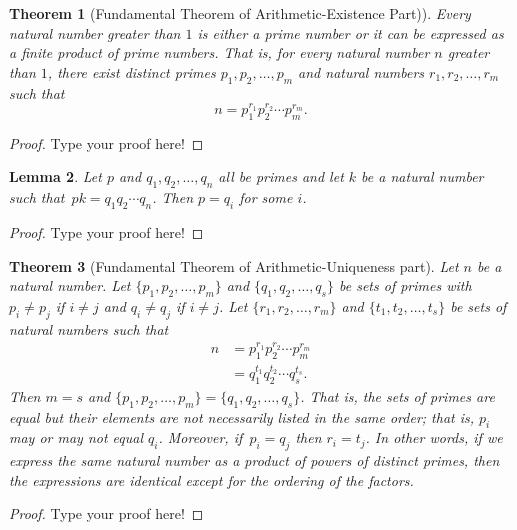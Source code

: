 \documentclass[12pt,leqno]{article}
\numberwithin{equation}{section}
\newtheorem{thm}{Theorem}[section]
\newtheorem{lem}[thm]{Lemma}
\theoremstyle{definition}
\begin{document}
\setcounter{thm}{6}


\begin{thm}[Fundamental Theorem of Arithmetic-Existence Part)]
Every natural number greater than $1$ is either a prime number or it
can be expressed as a finite product of prime numbers. That is, for
every natural number $n$ greater than $1$, there exist distinct
primes $p_1, p_2, \hdots, p_m$ and natural numbers $r_1, r_2,
\hdots, r_m$ such that \[n = p_1^{r_1}p_2^{r_2}\cdots p_m^{r_m}.\]
\end{thm}

\begin{proof}[Proof]
Type your proof here!
\end{proof}



\begin{lem}
Let $p$ and $q_1, q_2, \hdots, q_n$ all be primes and let $k$ be a
natural number such that~$p k = q_1q_2 \cdots q_n$.  Then $p = q_i$
for some $i$.
\end{lem}

\begin{proof}[Proof]
Type your proof here!
\end{proof}



\begin{thm}[Fundamental Theorem of Arithmetic-Uniqueness part]
Let $n$ be a natural number.  Let $\{p_1, p_2, \hdots, p_m\}$ and
$\{q_1, q_2, \hdots, q_s\}$ be sets of primes with $p_i \neq p_j$ if
$i \neq j$ and $q_i \neq q_j$ if $i \neq j$. Let $\{r_1, r_2,
\hdots, r_m\}$ and $\{t_1, t_2, \hdots, t_s\}$ be sets of natural
numbers such that
\begin{align*}
n & = p_1^{r_1}p_2^{r_2}\cdots p_m^{r_m} \\
  & = q_1^{t_1}q_2^{t_2}\cdots q_s^{t_s}.
\end{align*}
Then $m = s$ and $\{p_1, p_2, \hdots, p_m\} = \{q_1, q_2, \hdots,
q_s\}$. That is, the sets of primes are equal but their elements are
not necessarily listed in the same order; that is, $p_i$ may or may
not equal $q_i$.  Moreover, if~$p_i = q_j$ then $r_i = t_j$.  In
other words, if we express the same natural number as a product of
powers of distinct primes, then the expressions are identical except
for the ordering of the factors.
\end{thm}

\begin{proof}[Proof]
Type your proof here!
\end{proof}
\end{document}
